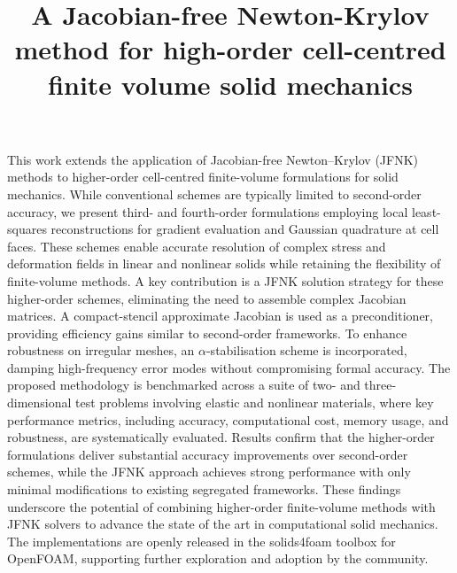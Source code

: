 \documentclass[sn-mathphys,Numbered]{sn-jnl}%
\begin{document}
\title[Article Title]{A Jacobian-free Newton-Krylov method for high-order cell-centred finite volume solid mechanics}

\author[1,2]{ }
\author*[1,3]{ }
\author[1]{ }


\abstract
{
This work extends the application of Jacobian-free Newton–Krylov (JFNK) methods to higher-order cell-centred finite-volume formulations for solid mechanics. While conventional schemes are typically limited to second-order accuracy, we present third- and fourth-order formulations employing local least-squares reconstructions for gradient evaluation and Gaussian quadrature at cell faces. These schemes enable accurate resolution of complex stress and deformation fields in linear and nonlinear solids while retaining the flexibility of finite-volume methods.
%
A key contribution is a JFNK solution strategy for these higher-order schemes, eliminating the need to assemble complex Jacobian matrices. A compact-stencil approximate Jacobian is used as a preconditioner, providing efficiency gains similar to second-order frameworks. To enhance robustness on irregular meshes, an $\alpha$-stabilisation scheme is incorporated, damping high-frequency error modes without compromising formal accuracy.
%
The proposed methodology is benchmarked across a suite of two- and three-dimensional test problems involving elastic and nonlinear materials, where key performance metrics, including accuracy, computational cost, memory usage, and robustness, are systematically evaluated.
Results confirm that the higher-order formulations deliver substantial accuracy improvements over second-order schemes, while the JFNK approach achieves strong performance with only minimal modifications to existing segregated frameworks.
%
These findings underscore the potential of combining higher-order finite-volume methods with JFNK solvers to advance the state of the art in computational solid mechanics.
%
The implementations are openly released in the solids4foam toolbox for OpenFOAM, supporting further exploration and adoption by the community.
}
\end{document}
